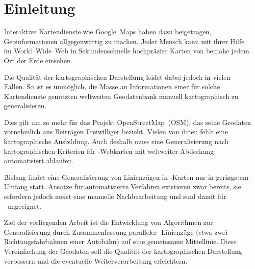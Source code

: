 \documentclass[../main/thesis.tex]{subfiles}
\begin{document}
\chapter{Einleitung}


Interaktive Kartendienste wie Google~Maps haben dazu beigetragen, Geoinformationen allgegenwärtig zu machen.
Jeder Mensch kann mit ihrer Hilfe im World~Wide~Web in Sekundenschnelle hochpräzise Karten von beinahe jedem Ort der Erde einsehen.

Die Qualität der kartographischen Darstellung leidet dabei jedoch in vielen Fällen.
So ist es unmöglich, die Masse an Informationen einer für solche Kartendienste genutzten weltweiten Geodatenbank manuell kartographisch zu generalisieren.

Dies gilt um so mehr für das Projekt OpenStreetMap~(OSM), das seine Geodaten vornehmlich aus Beiträgen Freiwilliger bezieht.
Vielen von ihnen fehlt eine kartographische Ausbildung.
Auch deshalb muss eine Generalisierung nach kartographischen Kriterien für \osm-Webkarten mit weltweiter Abdeckung automatisiert ablaufen.




Bislang findet eine Generalisierung von Linienzügen in \osm-Karten nur in geringstem Umfang statt.
Ansätze für automatisierte Verfahren existieren zwar bereits, sie erfordern jedoch meist eine manuelle Nachbearbeitung und sind damit für \osm\ ungeeignet.

Ziel der vorliegenden Arbeit ist die Entwicklung von Algorithmen zur Generalisierung durch Zusammenfassung paralleler \osm-Linienzüge (etwa zwei Richtungsfahrbahnen einer Autobahn) auf eine gemeinsame Mittellinie.
Diese Vereinfachung der Geodaten soll die Qualität der kartographischen Darstellung verbessern und die eventuelle Weiterverarbeitung erleichtern.
\end{document}

